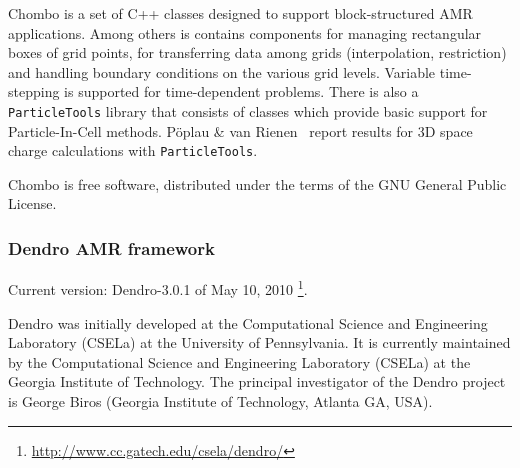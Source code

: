 \documentclass[11pt,pdftex]{article}
\begin{document}
Chombo is a set of C++ classes designed to support block-structured AMR
applications.  Among others is contains components for managing
rectangular boxes of grid points, for transferring data among grids
(interpolation, restriction) and handling boundary conditions on the
various grid levels.  Variable time-stepping is supported for
time-dependent problems.  There is also a \texttt{ParticleTools} library
that consists of classes which provide basic support for
Particle-In-Cell methods.  P\"oplau \& van Rienen~\cite{pori2008} report
results for 3D space charge calculations with \texttt{ParticleTools}.

\textsf{Chombo} is free software, distributed under the terms of the GNU
General Public License.


\subsubsection{\textsf{Dendro}  AMR framework}

Current version: \textsf{Dendro}-3.0.1 of May 10, 2010%
\footnote{\url{http://www.cc.gatech.edu/csela/dendro/}}.

\textsf{Dendro} was initially developed at the Computational Science and
Engineering Laboratory (CSELa) at the University of Pennsylvania. It is
currently maintained by the Computational Science and Engineering
Laboratory (CSELa) at the Georgia Institute of Technology.  The
principal investigator of the \textsf{Dendro} project is George Biros (Georgia
Institute of Technology, Atlanta GA, USA).
\end{document}
